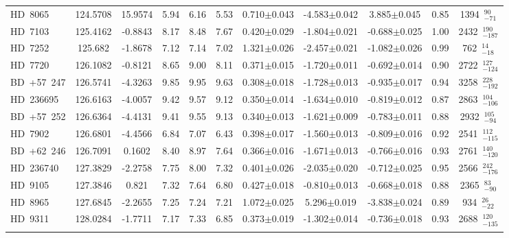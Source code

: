 {\begin{longtable}{lcccccccccc}
\noalign{\smallskip}
HD~8065 & 124.5708 & 15.9574 & 5.94 & 6.16 & 5.53 & 0.710$\pm$0.043 & -4.583$\pm$0.042 & 3.885$\pm$0.045 & 0.85 & 1394~$_{-71}^{90}$ \\
\noalign{\smallskip}
HD~7103 & 125.4162 & -0.8843 & 8.17 & 8.48 & 7.67 & 0.420$\pm$0.029 & -1.804$\pm$0.021 & -0.688$\pm$0.025 & 1.00 & 2432~$_{-187}^{190}$ \\
\noalign{\smallskip}
HD~7252 & 125.682 & -1.8678 & 7.12 & 7.14 & 7.02 & 1.321$\pm$0.026 & -2.457$\pm$0.021 & -1.082$\pm$0.026 & 0.99 & 762~$_{-18}^{14}$ \\
\noalign{\smallskip}
HD~7720 & 126.1082 & -0.8121 & 8.65 & 9.00 & 8.11 & 0.371$\pm$0.015 & -1.720$\pm$0.011 & -0.692$\pm$0.014 & 0.90 & 2722~$_{-124}^{127}$ \\
\noalign{\smallskip}
BD~+57~247 & 126.5741 & -4.3263 & 9.85 & 9.95 & 9.63 & 0.308$\pm$0.018 & -1.728$\pm$0.013 & -0.935$\pm$0.017 & 0.94 & 3258~$_{-192}^{228}$ \\
\noalign{\smallskip}
HD~236695 & 126.6163 & -4.0057 & 9.42 & 9.57 & 9.12 & 0.350$\pm$0.014 & -1.634$\pm$0.010 & -0.819$\pm$0.012 & 0.87 & 2863~$_{-106}^{104}$ \\
\noalign{\smallskip}
BD~+57~252 & 126.6364 & -4.4131 & 9.41 & 9.55 & 9.13 & 0.340$\pm$0.013 & -1.621$\pm$0.009 & -0.783$\pm$0.011 & 0.88 & 2932~$_{-94}^{105}$ \\
\noalign{\smallskip}
HD~7902 & 126.6801 & -4.4566 & 6.84 & 7.07 & 6.43 & 0.398$\pm$0.017 & -1.560$\pm$0.013 & -0.809$\pm$0.016 & 0.92 & 2541~$_{-115}^{112}$ \\
\noalign{\smallskip}
BD~+62~246 & 126.7091 & 0.1602 & 8.40 & 8.97 & 7.64 & 0.366$\pm$0.016 & -1.671$\pm$0.013 & -0.766$\pm$0.016 & 0.93 & 2761~$_{-120}^{140}$ \\
\noalign{\smallskip}
HD~236740 & 127.3829 & -2.2758 & 7.75 & 8.00 & 7.32 & 0.401$\pm$0.026 & -2.035$\pm$0.020 & -0.712$\pm$0.025 & 0.95 & 2566~$_{-176}^{242}$ \\
\noalign{\smallskip}
HD~9105 & 127.3846 & 0.821 & 7.32 & 7.64 & 6.80 & 0.427$\pm$0.018 & -0.810$\pm$0.013 & -0.668$\pm$0.018 & 0.88 & 2365~$_{-90}^{83}$ \\
\noalign{\smallskip}
HD~8965 & 127.6845 & -2.2655 & 7.25 & 7.24 & 7.21 & 1.072$\pm$0.025 & 5.296$\pm$0.019 & -3.838$\pm$0.024 & 0.89 & 934~$_{-22}^{26}$ \\
\noalign{\smallskip}
HD~9311 & 128.0284 & -1.7711 & 7.17 & 7.33 & 6.85 & 0.373$\pm$0.019 & -1.302$\pm$0.014 & -0.736$\pm$0.018 & 0.93 & 2688~$_{-135}^{120}$ \\
\noalign{\smallskip}

\end{longtable}}
